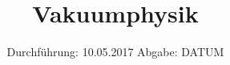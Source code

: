 

\subject{Versuch 70}
\title{Vakuumphysik}
\date{
  Durchführung: 10.05.2017
  \hspace{3em}
  Abgabe: DATUM
}



\listoftodos

\maketitle
\thispagestyle{empty}
\tableofcontents
\newpage



%


\printbibliography


